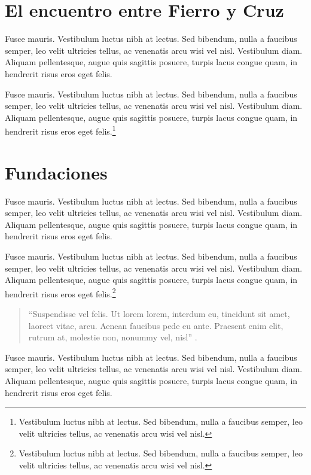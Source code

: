 \section{El encuentro entre Fierro y Cruz}

Fusce mauris. Vestibulum luctus nibh at lectus. Sed bibendum, nulla a faucibus semper, leo velit ultricies tellus, ac venenatis arcu wisi vel nisl. Vestibulum diam. Aliquam pellentesque, augue quis sagittis posuere, turpis lacus congue quam, in hendrerit risus eros eget felis.

Fusce mauris. Vestibulum luctus nibh at lectus. Sed bibendum, nulla a faucibus semper, leo velit ultricies tellus, ac venenatis arcu wisi vel nisl. Vestibulum diam. Aliquam pellentesque, augue quis sagittis posuere, turpis lacus congue quam, in hendrerit risus eros eget felis.\footnote{Vestibulum luctus nibh at lectus. Sed bibendum, nulla a faucibus semper, leo velit ultricies tellus, ac venenatis arcu wisi vel nisl.}

\section{Fundaciones}

Fusce mauris. Vestibulum luctus nibh at lectus. Sed bibendum, nulla a faucibus semper, leo velit ultricies tellus, ac venenatis arcu wisi vel nisl. Vestibulum diam. Aliquam pellentesque, augue quis sagittis posuere, turpis lacus congue quam, in hendrerit risus eros eget felis.

Fusce mauris. Vestibulum luctus nibh at lectus. Sed bibendum, nulla a faucibus semper, leo velit ultricies tellus, ac venenatis arcu wisi vel nisl. Vestibulum diam. Aliquam pellentesque, augue quis sagittis posuere, turpis lacus congue quam, in hendrerit risus eros eget felis.\footnote{Vestibulum luctus nibh at lectus. Sed bibendum, nulla a faucibus semper, leo velit ultricies tellus, ac venenatis arcu wisi vel nisl.}

\begin{quote}
	\enquote{Suspendisse vel felis. Ut lorem lorem, interdum eu, tincidunt sit amet, laoreet vitae, arcu. Aenean faucibus pede eu ante. Praesent enim elit, rutrum at, molestie non, nonummy vel, nisl} \parencite{@3189-QUIROGA2017}.
\end{quote}

Fusce mauris. Vestibulum luctus nibh at lectus. Sed bibendum, nulla a faucibus semper, leo velit ultricies tellus, ac venenatis arcu wisi vel nisl. Vestibulum diam. Aliquam pellentesque, augue quis sagittis posuere, turpis lacus congue quam, in hendrerit risus eros eget felis.

